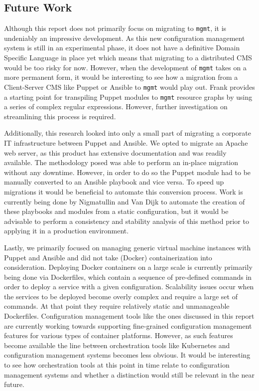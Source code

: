 \subsection{Future Work}\label{subsec:futurework}
Although this report does not primarily focus on migrating to \texttt{mgmt}, it is undeniably an impressive development. As this new configuration management system is still in an experimental phase, it does not have a definitive Domain Specific Language in place yet which means that migrating to a distributed CMS would be too risky for now. However, when the development of \texttt{mgmt} takes on a more permanent form, it would be interesting to see how a migration from a Client-Server CMS like Puppet or Ansible to \texttt{mgmt} would play out. Frank \cite{frank_2016} provides a starting point for transpiling Puppet modules to \texttt{mgmt} resource graphs by using a series of complex regular expressions. However, further investigation on streamlining this process is required.

Additionally, this research looked into only a small part of migrating a corporate IT infrastructure between Puppet and Ansible. We opted to migrate an Apache web server, as this product has extensive documentation and was readily available. The methodology posed was able to perform an in-place migration without any downtime. However, in order to do so the Puppet module had to be manually converted to an Ansible playbook and vice versa. To speed up migrations it would be beneficial to automate this conversion process. Work is currently being done by Nigmatullin and Van Dijk \cite{marat_2016} to automate the creation of these playbooks and modules from a static configuration, but it would be advisable to perform a consistency and stability analysis of this method prior to applying it in a production environment. 

Lastly, we primarily focused on managing generic virtual machine instances with Puppet and Ansible and did not take (Docker) containerization into consideration. Deploying Docker containers on a large scale is currently primarily being done via Dockerfiles, which contain a sequence of pre-defined commands in order to deploy a service with a given configuration. Scalability issues occur when the services to be deployed become overly complex and require a large set of commands. At that point they require relatively static and unmanageable Dockerfiles. Configuration management tools like the ones discussed in this report are currently working towards supporting fine-grained configuration management features for various types of container platforms. However, as such features become available the line between orchestration tools like Kubernetes \cite{kubernetes_2016} and configuration management systems becomes less obvious. It would be interesting to see how orchestration tools at this point in time relate to configuration management systems and whether a distinction would still be relevant in the near future.

